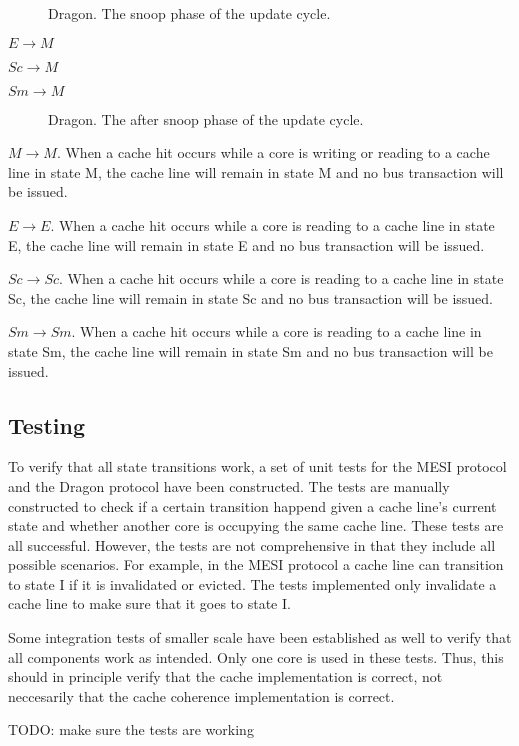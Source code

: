 \begin{figure}[H]
    \centering
    \caption{Dragon. The snoop phase of the update cycle.}
    \label{fig:dragon_snoop}
\end{figure}

$E \to M$

$Sc \to M$

$Sm \to M$


\begin{figure}[H]
    \centering
    \caption{Dragon. The after snoop phase of the update cycle.}
    \label{fig:dragon_after_snoop}
\end{figure}

$M \to M$.
When a cache hit occurs while a core is writing or reading to a cache line in state M, the cache line will remain in state M and no bus transaction will be issued.

$E \to E$.
When a cache hit occurs while a core is reading to a cache line in state E, the cache line will remain in state E and no bus transaction will be issued.

$Sc \to Sc$.
When a cache hit occurs while a core is reading to a cache line in state Sc, the cache line will remain in state Sc and no bus transaction will be issued.

$Sm \to Sm$.
When a cache hit occurs while a core is reading to a cache line in state Sm, the cache line will remain in state Sm and no bus transaction will be issued.

\subsection{Testing}
To verify that all state transitions work, a set of unit tests for the MESI protocol and the Dragon protocol have been constructed.
The tests are manually constructed to check if a certain transition happend given a cache line's current state and whether another core is occupying the same cache line.
These tests are all successful.
However, the tests are not comprehensive in that they include all possible scenarios.
For example, in the MESI protocol a cache line can transition to state I if it is invalidated or evicted.
The tests implemented only invalidate a cache line to make sure that it goes to state I.

Some integration tests of smaller scale have been established as well to verify that all components work as intended.
Only one core is used in these tests.
Thus, this should in principle verify that the cache implementation is correct, not neccesarily that the cache coherence implementation is correct.

TODO: make sure the tests are working
